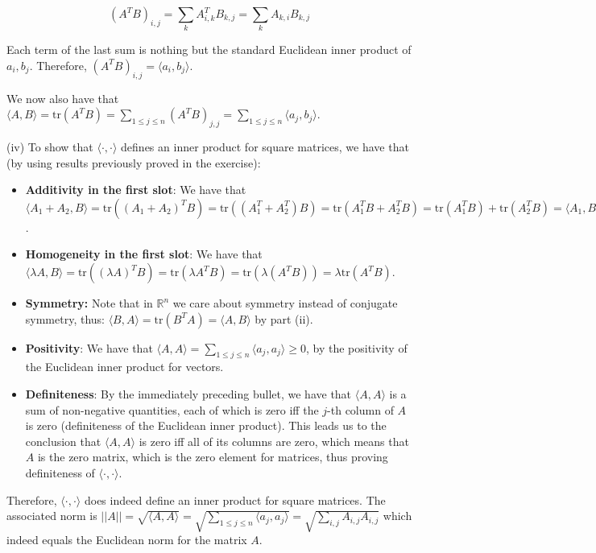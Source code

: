 \begin{solution}
    $$(A^TB)_{i, j} = \sum_{k} A^T_{i, k} B_{k, j} = \sum_{k} A_{k, i} B_{k, j}$$

    Each term of the last sum is nothing but the standard Euclidean inner product of $a_i, b_j$. Therefore, $(A^TB)_{i, j} = \langle a_i, b_j \rangle$.

    We now also have that $\langle A, B \rangle = \text{tr}(A^TB) = \sum_{1 \leq j \leq n} (A^TB)_{j, j} = \sum_{1 \leq j \leq n} \langle a_j, b_j \rangle$.

    (iv) To show that $\langle \cdot, \cdot \rangle$ defines an inner product for square matrices, we have that (by using results previously proved in the exercise):
    \begin{itemize}
        \item \textbf{Additivity in the first slot}: We have that $\langle A_1 + A_2, B \rangle = \text{tr}((A_1+A_2)^TB) = \text{tr}((A_1^T+A_2^T)B) = \text{tr}(A_1^TB + A_2^TB) = \text{tr}(A_1^TB) + \text{tr}(A_2^TB) = \langle A_1, B \rangle + \langle A_2, B \rangle$.
        \item \textbf{Homogeneity in the first slot}: We have that $\langle \lambda A, B \rangle = \text{tr}((\lambda A)^TB) = \text{tr}(\lambda A^TB) = \text{tr}(\lambda(A^TB)) = \lambda \text{tr}(A^TB)$.
        \item \textbf{Symmetry:} Note that in $\mathbb{R}^n$ we care about symmetry instead of conjugate symmetry, thus: $\langle B, A \rangle = \text{tr}(B^TA) = \langle A, B \rangle$ by part (ii).

        \item \textbf{Positivity}: We have that $\langle A, A \rangle =  \sum_{1 \leq j \leq n} \langle a_j, a_j \rangle \geq 0$, by the positivity of the Euclidean inner product for vectors.

        \item  \textbf{Definiteness}: By the immediately preceding bullet, we have that $\langle A, A \rangle$ is a sum of non-negative quantities, each of which is zero iff the $j$-th column of $A$ is zero (definiteness of the Euclidean inner product). This leads us to the conclusion that $\langle A, A \rangle$ is zero iff all of its columns are zero, which means that $A$ is the zero matrix, which is the zero element for matrices, thus proving definiteness of $\langle \cdot, \cdot \rangle$.
    \end{itemize}

    Therefore, $\langle \cdot, \cdot \rangle$ does indeed define an inner product for square matrices. The associated norm is $\lvert \lvert A \rvert \rvert = \sqrt{\langle A, A \rangle} = \sqrt{\sum_{1 \leq j \leq n} \langle a_j, a_j \rangle} = \sqrt{\sum_{i, j} A_{i, j} A_{i, j}}$ which indeed equals the Euclidean norm for the matrix $A$.\bigskip
    

\end{solution}
